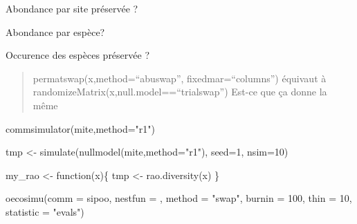 \documentclass[]{article}
\newenvironment{Shaded}{\begin{snugshade}}{\end{snugshade}}
\newcommand{\KeywordTok}[1]{\textcolor[rgb]{0.94,0.87,0.69}{#1}}
\newcommand{\DataTypeTok}[1]{\textcolor[rgb]{0.87,0.87,0.75}{#1}}
\newcommand{\DecValTok}[1]{\textcolor[rgb]{0.86,0.86,0.80}{#1}}
\newcommand{\StringTok}[1]{\textcolor[rgb]{0.80,0.58,0.58}{#1}}
\newcommand{\CommentTok}[1]{\textcolor[rgb]{0.50,0.62,0.50}{#1}}
\newcommand{\ControlFlowTok}[1]{\textcolor[rgb]{0.94,0.87,0.69}{#1}}
\newcommand{\OperatorTok}[1]{\textcolor[rgb]{0.94,0.94,0.82}{#1}}
\newcommand{\NormalTok}[1]{\textcolor[rgb]{0.80,0.80,0.80}{#1}}
\begin{document}
Abondance par site préservée ?

\begin{Shaded}
\end{Shaded}

Abondance par espèce?

\begin{Shaded}
\end{Shaded}

Occurence des espèces préservée ?

\begin{Shaded}
\end{Shaded}

\begin{quote}
permatswap(x,method=``abuswap'', fixedmar=``columns'') équivaut à
randomizeMatrix(x,null.model==``trialswap'') Est-ce que ça donne la même
\end{quote}

\begin{Shaded}
\begin{Highlighting}[]
\KeywordTok{commsimulator}\NormalTok{(mite,}\DataTypeTok{method=}\StringTok{"r1"}\NormalTok{)}

\NormalTok{tmp <-}\StringTok{ }\KeywordTok{simulate}\NormalTok{(}\KeywordTok{nullmodel}\NormalTok{(mite,}\DataTypeTok{method=}\StringTok{"r1"}\NormalTok{), }\DataTypeTok{seed=}\DecValTok{1}\NormalTok{, }\DataTypeTok{nsim=}\DecValTok{10}\NormalTok{)}

\NormalTok{my_rao <-}\StringTok{ }\ControlFlowTok{function}\NormalTok{(x)\{}
\NormalTok{  tmp <-}\StringTok{ }\KeywordTok{rao.diversity}\NormalTok{(x)}
\NormalTok{  \}}

\KeywordTok{oecosimu}\NormalTok{(}\DataTypeTok{comm =}\NormalTok{ sipoo, }\DataTypeTok{nestfun =}\NormalTok{ , }\DataTypeTok{method =} \StringTok{"swap"}\NormalTok{,}
\DataTypeTok{burnin =} \DecValTok{100}\NormalTok{, }\DataTypeTok{thin =} \DecValTok{10}\NormalTok{, }\DataTypeTok{statistic =} \StringTok{"evals"}\NormalTok{)}
\end{Highlighting}
\end{Shaded}
\end{document}
